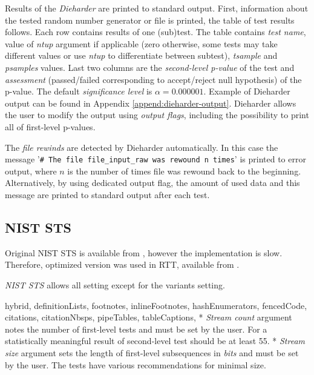 \documentclass[
  digital,     %
  oneside,     %
  nosansbold,  %
  nocolorbold, %
  nolof,         %
  nolot,         %
]{fithesis4}
\begin{document}
Results of the \emph{Dieharder} are printed to standard output. First, information about the tested random number generator or file is printed, the table of test results follows. Each row contains results of one (sub)test. The table contains \emph{test name}, value of \emph{ntup} argument if applicable (zero otherwise, some tests may take different values or use \emph{ntup} to differentiate between subtest), \emph{tsample} and \emph{psamples} values. Last two columns are the \emph{second-level p-value} of the test and \emph{assessment} (passed/failed corresponding to accept/reject null hypothesis) of the p-value. The default \emph{significance level} is $\alpha=0.000001$. Example of Dieharder output can be found in Appendix \ref{append:dieharder-output}. Dieharder allows the user to modify the output using \emph{output flags}, including the possibility to print all of first-level p-values.

The \emph{file rewinds} are detected by Dieharder automatically. In this case the message '\verb|# The file file_input_raw was rewound n times|' is printed to error output, where $n$ is the number of times file was rewound back to the beginning. Alternatively, by using dedicated output flag, the amount of used data and this message are printed to standard output after each test.

\subsection{NIST STS} \label{chap:sols-nist}

Original NIST STS is available from \cite{nist_site}, however the implementation is slow. Therefore, optimized version was used in RTT, available from \cite{rtt-batteries}.

\emph{NIST STS} allows all setting except for the variants setting.
\begin{markdown*}{%
  hybrid,
  definitionLists,
  footnotes,
  inlineFootnotes,
  hashEnumerators,
  fencedCode,
  citations,
  citationNbsps,
  pipeTables,
  tableCaptions,
}
* \emph{Stream count} argument notes the number of first-level tests and must be set by the user. For a statistically meaningful result of second-level test should be at least 55. 
* \emph{Stream size} argument sets the length of first-level subsequences in \emph{bits} and must be set by the user. The tests have various recommendations for minimal size.
\end{markdown*}
\end{document}
